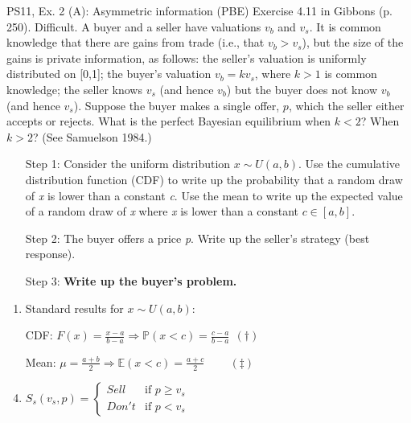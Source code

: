 \begin{frame}{PS11, Ex. 2 (A): Asymmetric information (PBE)}
    Exercise 4.11 in Gibbons (p. 250). Difficult. A buyer and a seller have valuations $v_b$ and $v_s$. It is common knowledge that there are gains from trade (i.e., that $v_b > v_s$), but the size of the gains is private information, as follows: the seller’s valuation is uniformly distributed on [0,1]; the buyer’s valuation $v_b = kv_s$, where $k > 1$ is common knowledge; the seller knows $v_s$ (and hence $v_b$) but the buyer does not know $v_b$ (and hence $v_s$). Suppose the buyer makes a single offer, $p$, which the seller either accepts or rejects. What is the perfect Bayesian equilibrium when $k < 2$? When $k > 2$? (See Samuelson 1984.) \vspace{-8pt}
    \begin{multicols}{2}
      \begin{itemize}
        \item[Step 1:] Consider the uniform distribution $x\sim U(a, b)$. Use the cumulative distribution function (CDF) to write up the probability that a random draw of \textit{x} is lower than a constant \textit{c}. Use the mean to write up the expected value of a random draw of \textit{x} where \textit{x} is lower than a constant $c\in[a,b]$.
        \item[Step 2:] The buyer offers a price \textit{p}. Write up the seller's strategy (best response).
        \item[Step 3:] \textbf{Write up the buyer's problem.}
      \end{itemize}
      \vfill\null\columnbreak
      \begin{enumerate}
        \item Standard results for $x\sim U(a, b):$
        \item[CDF:] $F(x)=\frac{x-a}{b-a}\Rightarrow\mathbb{P}(x<c)=\frac{c-a}{b-a}\ \ (\dagger)$
        \item[Mean:] $\mu=\frac{a+b}{2}\Rightarrow\mathbb{E}(x<c)=\frac{a+c}{2}\quad\quad\ (\ddagger)$
        \item $S_s(v_s,p)=\left\{\begin{array}{ll}
          Sell  & \text{if }p\geq v_s \\
          Don't & \text{if }p < v_s
        \end{array}\right.$
      \end{enumerate}
      \vfill\null
    \end{multicols}
\end{frame}
